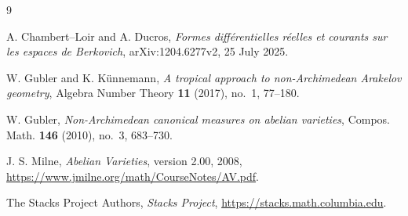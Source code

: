 \documentclass[11pt]{article}
\begin{document}




\begin{thebibliography}{9}

A. Chambert--Loir and A. Ducros,
\emph{Formes diff\'erentielles r\'eelles et courants sur les espaces de
Berkovich}, arXiv:1204.6277v2, 25 July 2025.

W. Gubler and K. K\"unnemann,
\emph{A tropical approach to non-Archimedean Arakelov geometry},
Algebra Number Theory \textbf{11} (2017), no.~1, 77--180.

W. Gubler,
\emph{Non-Archimedean canonical measures on abelian varieties},
Compos. Math. \textbf{146} (2010), no.~3, 683--730.

J. S. Milne,
\emph{Abelian Varieties}, version 2.00, 2008,
\url{https://www.jmilne.org/math/CourseNotes/AV.pdf}.

The Stacks Project Authors,
\emph{Stacks Project}, \url{https://stacks.math.columbia.edu}.

\end{thebibliography}
\end{document}
